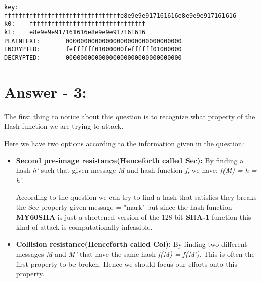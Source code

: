 \documentclass[10pt,a4paper,oneside]{article}
\begin{document}
\begin{lstlisting}
key:   ffffffffffffffffffffffffffffffffe8e9e9e917161616e8e9e9e917161616
k0:    ffffffffffffffffffffffffffffffff
k1:    e8e9e9e917161616e8e9e9e917161616
PLAINTEXT:       00000000000000000000000000000000
ENCRYPTED:       feffffff01000000feffffff01000000
DECRYPTED:       00000000000000000000000000000000
\end{lstlisting}

\section*{Answer - 3:}
The first thing to notice about this question is to recognize what property of the Hash function we are trying to attack.\par
Here we have two options according to the information given in the question:
\begin{itemize}
\item \textbf{Second pre-image resistance(Henceforth called Sec):}
By finding a hash \textit{h'} such that given message \textit{M} and hash function \textit{f}, we have: \textit{f(M) = h = h'}.\par
According to the question we can try to find a hash that satisfies they breaks the Sec property given message = "mark" but since the hash function \textbf{MY60SHA} is just a shortened version of the 128 bit \textbf{SHA-1} function this kind of attack is computationally infeasible.

\item \textbf{Collision resistance(Henceforth called Col):}
By finding two different messages \textit{M} and \textit{M'} that have the same hash \textit{f(M) = f(M')}. This is often the first property to be broken. Hence we should focus our efforts onto this property.
\end{itemize}
\end{document}
